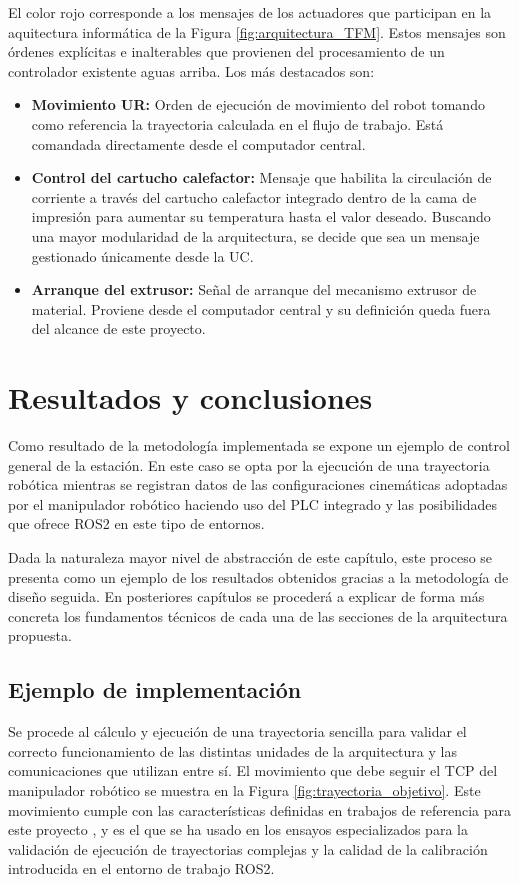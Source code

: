 El color rojo corresponde a los mensajes de los actuadores que participan en la aquitectura informática de la Figura \ref{fig:arquitectura_TFM}. Estos mensajes son órdenes explícitas e inalterables que provienen del procesamiento de un controlador existente aguas arriba. Los más destacados son:
\begin{itemize}
    \item \textbf{Movimiento UR:} Orden de ejecución de movimiento del robot tomando como referencia la trayectoria calculada en el flujo de trabajo. Está comandada directamente desde el computador central.
    \item \textbf{Control del cartucho calefactor:} Mensaje que habilita la circulación de corriente a través del cartucho calefactor integrado dentro de la cama de impresión para aumentar su temperatura hasta el valor deseado. Buscando una mayor modularidad de la arquitectura, se decide que sea un mensaje gestionado únicamente desde la UC.
    \item \textbf{Arranque del extrusor:} Señal de arranque del mecanismo extrusor de material. Proviene desde el computador central y su definición queda fuera del alcance de este proyecto.
\end{itemize}


\section{Resultados y conclusiones}
Como resultado de la metodología implementada se expone un ejemplo de control general de la estación. En este caso se opta por la ejecución de una trayectoria robótica mientras se registran datos de las configuraciones cinemáticas adoptadas por el manipulador robótico haciendo uso del \acrshort{PLC} integrado y las posibilidades que ofrece ROS2 en este tipo de entornos. 

Dada la naturaleza mayor nivel de abstracción de este capítulo, este proceso se presenta como un ejemplo de los resultados obtenidos gracias a la metodología de diseño seguida. En posteriores capítulos se procederá a explicar de forma más concreta los fundamentos técnicos de cada una de las secciones de la arquitectura propuesta.

\subsection{Ejemplo de implementación}
\label{sec: ejemplo implementacion diseño arquitectura}

Se procede al cálculo y ejecución de una trayectoria sencilla para validar el correcto funcionamiento de las distintas unidades de la arquitectura y las comunicaciones que utilizan entre sí. El movimiento que debe seguir el \acrshort{TCP} del manipulador robótico se muestra en la Figura \ref{fig:trayectoria_objetivo}. Este movimiento cumple con las características definidas en trabajos de referencia para este proyecto \cite{paper_Q1_Alvaro_Adrian}\cite{TFM_SanchoAmparo}, y es el que se ha usado en los ensayos especializados para la validación de ejecución de trayectorias complejas y la calidad de la calibración introducida en el entorno de trabajo ROS2.  

